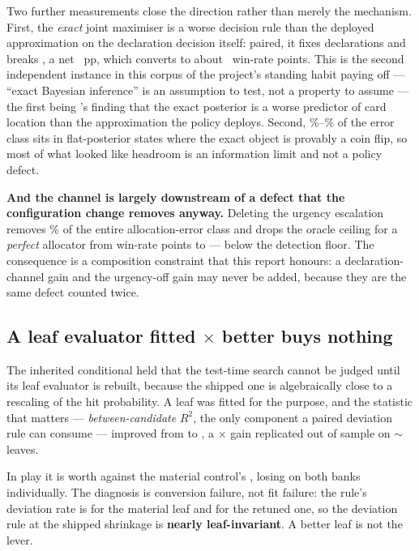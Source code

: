 Two further measurements close the direction rather than merely the mechanism. First, the
\emph{exact} joint maximiser is a worse decision rule than the deployed approximation on the
declaration decision itself: paired, it fixes \vsevenJointFixed{} declarations and breaks \vsevenJointBroken{}, a net
\vsevenJointWorseNet{}~pp, which converts to about \vsevenJointWorseWin{}~win-rate points. This is the
second independent instance in this corpus of the project's standing habit paying off --- ``exact
Bayesian inference'' is an assumption to test, not a property to assume --- the first being \vsix{}'s
finding that the exact posterior is a worse predictor of card location than the approximation the
policy deploys. Second, \vsevenJointFlatLo\%--\vsevenJointFlatHi\% of the error class sits in
flat-posterior states where the exact object is provably a coin flip, so most of what looked like
headroom is an information limit and not a policy defect.

\textbf{And the channel is largely downstream of a defect that the configuration change removes
anyway.} Deleting the urgency escalation removes \vsevenLoneUrgencyShare\% of the entire
allocation-error class and drops the oracle ceiling for a \emph{perfect} allocator from
\vsevenLoneCeilingBefore{} win-rate points to \vsevenLoneCeilingAfter{} --- below the detection floor.
The consequence is a composition constraint that this report honours: a declaration-channel gain and
the urgency-off gain may never be added, because they are the same defect counted twice.

\subsection{A leaf evaluator fitted \vsevenKoneFold$\times$ better buys nothing}
\label{sec:rejected-leaf}

The inherited conditional held that the test-time search cannot be judged until its leaf evaluator is
rebuilt, because the shipped one is algebraically close to a rescaling of the hit probability. A leaf
was fitted for the purpose, and the statistic that matters --- \emph{between-candidate} $R^2$, the
only component a paired deviation rule can consume --- improved from \vsevenKoneRsqBefore{} to
\vsevenKoneRsqAfter{}, a \vsevenKoneFold$\times$ gain replicated out of sample on $\sim$\vsevenKoneLeaves{} leaves.

In play it is worth \vsevenKoneInPlay{} against the material control's \vsevenKoneControl{}, losing on
both banks individually. The diagnosis is conversion failure, not fit failure: the rule's deviation
rate is \vsevenKoneChangeLo{} for the material leaf and \vsevenKoneChangeHi{} for the retuned one, so
the deviation rule at the shipped shrinkage is \textbf{nearly leaf-invariant}. A better leaf is not
the lever.

